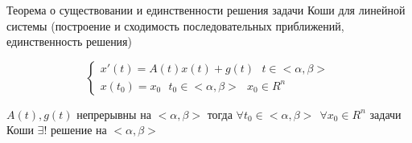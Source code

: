 \begin{title}[\Large]
  Теорема о существовании и единственности решения задачи Коши для линейной
  системы (построение и сходимость последовательных приближений,
  единственность решения)
\end{title}

\begin{define}
  $$
  \left\{
  \begin{array}{l}
    x'(t) = A(t)x(t) + g(t) ~~~ t \in <\alpha, \beta> \\
    x(t_0) = x_0 ~~~ t_0 \in <\alpha, \beta> ~~~ x_0 \in R^n
  \end{array}
  \right.
  $$
\end{define}

\begin{theorem}
  $A(t), g(t)$ непрерывны на $<\alpha, \beta>$ тогда
  $\forall t_0 \in <\alpha, \beta> ~~ \forall x_0 \in R^n$ задачи Коши
  $\exists !$ решение на $<\alpha, \beta>$
\end{theorem}

